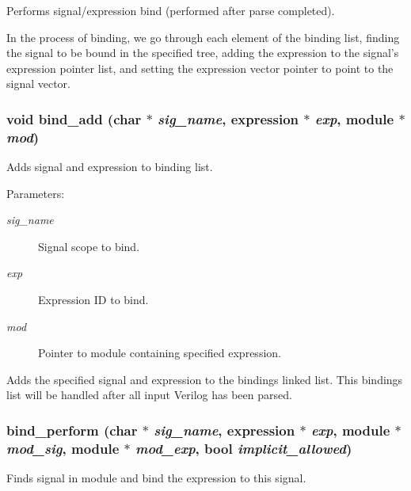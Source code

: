 Performs signal/expression bind (performed after parse completed). 

In the process of binding, we go through each element of the binding list, finding the signal to be bound in the specified tree, adding the expression to the signal's expression pointer list, and setting the expression vector pointer to point to the signal vector. 
\subsubsection{\setlength{\rightskip}{0pt plus 5cm}void bind\_\-add (char $\ast$ {\em sig\_\-name}, {\bf expression} $\ast$ {\em exp}, {\bf module} $\ast$ {\em mod})}\label{binding_8c_a5}


Adds signal and expression to binding list. 

\begin{Desc}
\item[Parameters:]
\begin{description}
\item[{\em sig\_\-name}]Signal scope to bind. \item[{\em exp}]Expression ID to bind. \item[{\em mod}]Pointer to module containing specified expression.\end{description}
\end{Desc}
Adds the specified signal and expression to the bindings linked list. This bindings list will be handled after all input Verilog has been parsed. 
\subsubsection{ bind\_\-perform (char $\ast$ {\em sig\_\-name}, {\bf expression} $\ast$ {\em exp}, {\bf module} $\ast$ {\em mod\_\-sig}, {\bf module} $\ast$ {\em mod\_\-exp}, {\bf bool} {\em implicit\_\-allowed})}\label{binding_8c_a7}


Finds signal in module and bind the expression to this signal. 

